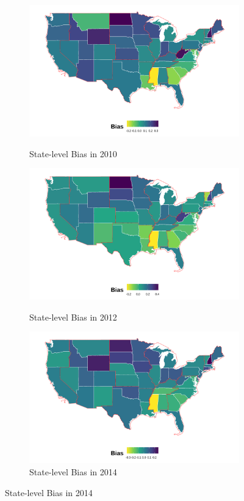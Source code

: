 \documentclass[12pt,english]{article}
\begin{document}
\begin{center}
\begin{figure}[H]
\begin{subfigure}{.45\textwidth}
\label{fig:skiniat-map-2008}
\end{subfigure}
\hfill%
\begin{subfigure}{.45\textwidth}
\caption{State-level Bias in 2010}
\centering
\includegraphics[width=0.9\linewidth]{figure/2010skinmap.png} 
\label{fig:skiniat-map-2010}
\end{subfigure}
\hfill%
\begin{subfigure}{.45\textwidth}
\caption{State-level Bias in 2012}
\centering
\includegraphics[width=0.9\linewidth]{figure/2012skinmap.png} 
\label{fig:skiniat-map-2012}
\end{subfigure}
\hfill%
\begin{subfigure}{.45\textwidth}
\caption{State-level Bias in 2014}
\centering
\includegraphics[width=0.9\linewidth]{figure/2014skinmap.png} 

\end{subfigure}
\end{figure}
\end{center}
\end{document}
